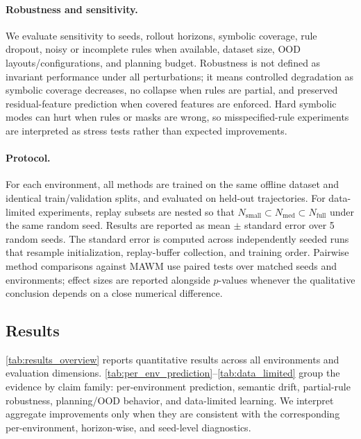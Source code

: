 \documentclass{article}
\theoremstyle{plain}
\theoremstyle{definition}
\theoremstyle{remark}
\begin{document}
\paragraph{Robustness and sensitivity.}
We evaluate sensitivity to seeds, rollout horizons, symbolic coverage, rule dropout, noisy or incomplete rules when available, dataset size, OOD layouts/configurations, and planning budget. Robustness is not defined as invariant performance under all perturbations; it means controlled degradation as symbolic coverage decreases, no collapse when rules are partial, and preserved residual-feature prediction when covered features are enforced. Hard symbolic modes can hurt when rules or masks are wrong, so misspecified-rule experiments are interpreted as stress tests rather than expected improvements.

\paragraph{Protocol.}
For each environment, all methods are trained on the same offline dataset
and identical train/validation splits, and evaluated on held-out trajectories.
For data-limited experiments, replay subsets are nested so that
$N_{\mathrm{small}} \subset N_{\mathrm{med}} \subset N_{\mathrm{full}}$
under the same random seed.
Results are reported as mean $\pm$ standard error over 5 random seeds. The standard error is computed across independently seeded runs that resample initialization, replay-buffer collection, and training order.
Pairwise method comparisons against MAWM use paired tests over matched seeds and environments; effect sizes are reported alongside $p$-values whenever the qualitative conclusion depends on a close numerical difference.

\subsection{Results}
\label{sec:results}

\autoref{tab:results_overview} reports quantitative results across all environments and evaluation dimensions.
\autoref{tab:per_env_prediction}--\autoref{tab:data_limited} group the evidence by claim family: per-environment prediction, semantic drift, partial-rule robustness, planning/OOD behavior, and data-limited learning. We interpret aggregate improvements only when they are consistent with the corresponding per-environment, horizon-wise, and seed-level diagnostics.
\end{document}
